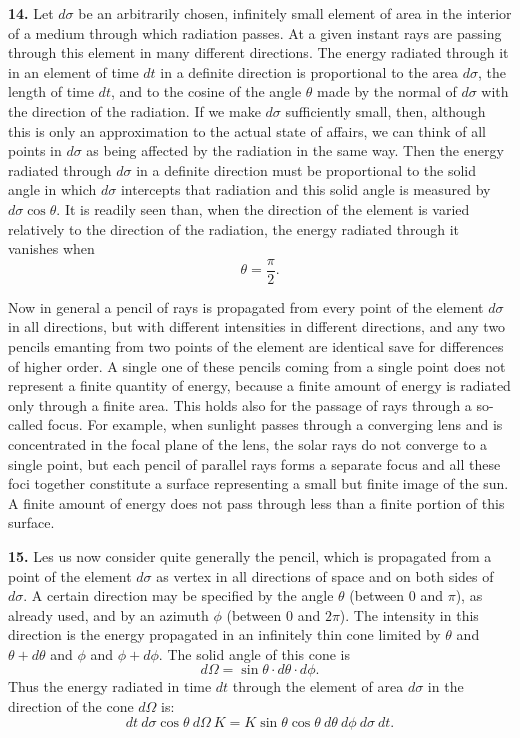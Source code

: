 \documentclass[12pt,oneside]{book}
\begin{document}
\textbf{14.} Let $d\sigma$ be an arbitrarily chosen, infinitely small element of area in the interior of a medium through which radiation passes. At a given instant rays are passing through this element in many different directions. The energy radiated through it in an element of time $dt$ in a definite direction is proportional to the area $d\sigma$, the length of time $dt$, and to the cosine of the angle $\theta$ made by the normal of $d\sigma$ with the direction of the radiation. If we make $d\sigma$ sufficiently small, then, although this is only an approximation to the actual state of affairs, we can think of all points in $d\sigma$ as being affected by the radiation in the same way. Then the energy radiated through $d\sigma$ in a definite direction must be proportional to the solid angle in which $d\sigma$ intercepts that radiation and this solid angle is measured by $d\sigma \cos \theta$. It is readily seen than, when the direction of the element is varied relatively to the direction of the radiation, the energy radiated through it vanishes when
$$\theta=\frac{\pi}{2}.$$ \par

Now in general a pencil of rays is propagated from every point of the element $d\sigma$ in all directions, but with different intensities in different directions, and any two pencils emanting from two points of the element are identical save for differences of higher order. A single one of these pencils coming from a single point does not represent a finite quantity of energy, because a finite amount of energy is radiated only through a finite area. This holds also for the passage of rays through a so-called focus. For example, when sunlight passes through a converging lens and is concentrated in the focal plane of the lens, the solar rays do not converge to a single point, but each pencil of parallel rays forms a separate focus and all these foci together constitute a surface representing a small but finite image of the sun. A finite amount of energy does not pass through less than a finite portion of this surface. \par

\textbf{15.} Les us now consider quite generally the pencil, which is propagated from a point of the element $d\sigma$ as vertex in all directions of space and on both sides of $d\sigma$. A certain direction may be specified by the angle $\theta$ (between 0 and $\pi$), as already used, and by an azimuth $\phi$ (between 0 and $2\pi$). The intensity in this direction is the energy propagated in an infinitely thin cone limited by $\theta$ and $\theta+d\theta$ and $\phi$ and $\phi+d\phi$. The solid angle of this cone is
\begin{equation}
    \label{eq5}
    d\Omega=\sin\theta\cdot d\theta\cdot d\phi.
\end{equation}
Thus the energy radiated in time $dt$ through the element of area $d\sigma$ in the direction of the cone $d\Omega$ is:
\begin{equation}
    \label{eq6}
    dt\ d\sigma \cos\theta\ d\Omega\ K=K\sin\theta\cos\theta\ d\theta\ d\phi\ d\sigma\ dt.
\end{equation} \par
\end{document}
